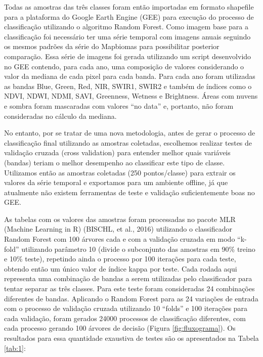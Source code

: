 Todas as amostras das três classes foram então importadas em formato shapefile para a plataforma do Google Earth Engine (GEE) para execução do processo de classificação utilizando o algoritmo Random Forest. Como imagem base para a classificação foi necessário ter uma série temporal com imagens anuais seguindo os mesmos padrões da série do Mapbiomas para possibilitar posterior comparação. Essa série de imagens foi gerada utilizando um script desenvolvido no GEE contendo, para cada ano, uma composição de valores considerando o valor da mediana de cada pixel para cada banda. Para cada ano foram utilizadas as bandas Blue, Green, Red, NIR, SWIR1, SWIR2 e também de índices como o NDVI, NDWI, NDMI, SAVI, Greenness, Wetness e Brightness. Áreas com nuvens e sombra foram mascaradas com valores “no data” e, portanto, não foram consideradas no cálculo da mediana.

No entanto, por se tratar de uma nova metodologia, antes de gerar o processo de classificação final utilizando as amostras coletadas, escolhemos realizar testes de validação cruzada (cross validation) para entender melhor quais variáveis (bandas) teriam o melhor desempenho ao classificar este tipo de classe. Utilizamos então as amostras coletadas (250 pontos/classe) para extrair os valores da série temporal e exportamos para um ambiente offline, já que atualmente não existem ferramentas de teste e validação suficientemente boas no GEE.

As tabelas com os valores das amostras foram processadas no pacote MLR (Machine Learning in R) (BISCHL, et al., 2016) utilizando o classificador Random Forest com 100 árvores cada e com a validação cruzada em modo “k-fold” utilizando parâmetro 10 (divide o subconjunto das amostras em 90\% treino e 10\% teste), repetindo ainda o processo por 100 iterações para cada teste, obtendo então um único valor de índice kappa por teste. Cada rodada aqui representa uma combinação de bandas a serem utilizadas pelo classificador para tentar separar as três classes. Para este teste foram consideradas 24 combinações diferentes de bandas. Aplicando o Random Forest para as 24 variações de entrada com o processo de validação cruzada utilizando 10 “folds” e 100 iterações para cada validação, foram gerados 24000 processos de classificação diferentes, com cada processo gerando 100 árvores de decisão (Figura \ref{fig:fluxograma}). Os resultados para essa quantidade exaustiva de testes são os apresentados na Tabela \ref{tab:1}:


